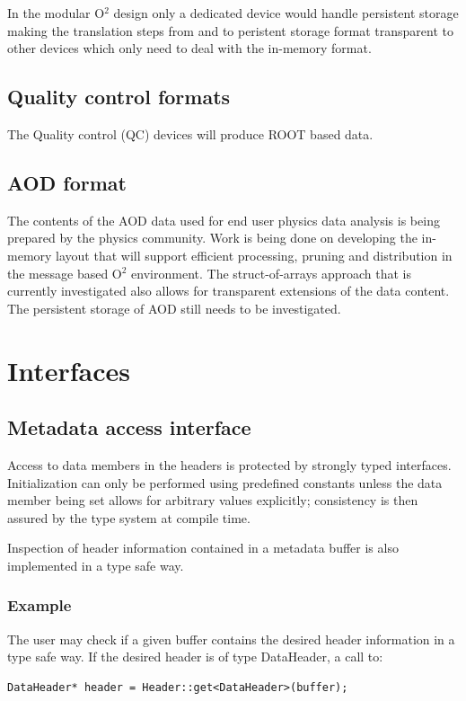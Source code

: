 \documentclass[a4paper,twoside]{article}
\newcommand\comment[1]{\color{red}{ #1 }\color{black}}
\def\O2{O$^2$}
\begin{document}
{In the modular \O2 design only a dedicated device would handle persistent storage making the translation steps from and to peristent storage format transparent to other devices which only need to deal with the in-memory format.

\subsection{Quality control formats}
The Quality control (QC) devices will produce ROOT based data.

\subsection{AOD format}
The contents of the AOD data used for end user physics data analysis is being prepared by the physics community. Work is being done on developing the in-memory layout that will support efficient processing, pruning and distribution in the message based \O2 environment. The struct-of-arrays approach that is currently investigated also allows for transparent extensions of the data content. The persistent storage of AOD still needs to be investigated.
}

\section{Interfaces}

\comment{
A minimal reference set of interfaces providing type-safe construction and access to the metadata-payload protocol of the \O2 message is developed.
This complete, but minimal working set is meant to be augmented by higher level interfaces based of the needs of the community.
}

\subsection{Metadata access interface}

Access to data members in the headers is protected by strongly typed interfaces. Initialization can only be performed using predefined constants unless the data member being set allows for arbitrary values explicitly; consistency is then assured by the type system at compile time.

Inspection of header information contained in a metadata buffer is also implemented in a type safe way.

\subsubsection{Example}
The user may check if a given buffer contains the desired header information in a type safe way. If the desired header is of type DataHeader, a call to:
\begin{lstlisting}
DataHeader* header = Header::get<DataHeader>(buffer);
\end{lstlisting}
\end{document}
